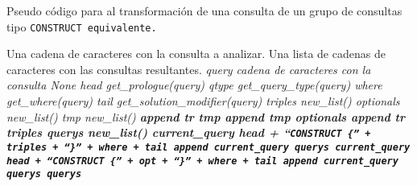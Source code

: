 \begin{algorithm}
  \caption{Pseudo código para al transformación de una consulta de un grupo
  de consultas tipo \tt{CONSTRUCT} equivalente.}\label{alg:extract}
  \begin{algorithmic}[1]
    \Require Una cadena de caracteres con la consulta a analizar.
    \Ensure Una lista de cadenas de caracteres con las consultas resultantes.
    \State \it{query} \get cadena de caracteres con la consulta
      \State \Return \it{None}
    \EndIf
    \State \it{head}  \get \it{get\_prologue}(\it{query})
    \State \it{qtype} \get \it{get\_query\_type}(\it{query})
    \State \it{where} \get \it{get\_where}(\it{query})
    \State \it{tail}  \get \it{get\_solution\_modifier}(\it{query})
    \State \it{triples}   \get \it{new\_list}()
    \State \it{optionals} \get \it{new\_list}()
        \State \it{tmp} \get \it{new\_list}()
          \State \bf{append} \it{tr} \ra \it{tmp}
        \EndFor
        \State \bf{append} \it{tmp} \ra \it{optionals}
      \Else
          \State \bf{append} \it{tr} \ra \it{triples}
        \EndFor
      \EndIf
    \EndFor
    \State \it{querys} \get \it{new\_list}()
    \State \it{current\_query} \get \it{head} + ``\tt{CONSTRUCT \{}'' + 
           \it{triples} + ``\tt{\}}'' + \it{where} + \it{tail} 
    \State \bf{append} \it{current\_query} \ra \it{querys}
      \State \it{current\_query} \get \it{head} + ``\tt{CONSTRUCT \{}'' + 
             \it{opt} + ``\tt{\}}'' + \it{where} + \it{tail} 
      \State \bf{append} \it{current\_query} \ra \it{querys}
    \EndFor
    \State \Return \it{querys}
  \end{algorithmic}
\end{algorithm}
